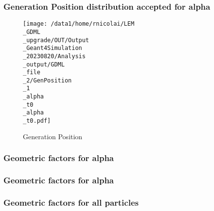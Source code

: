 \documentclass[8pt]{beamer}
\begin{document}
            \begin{frame}
                \frametitle{Generation Position distribution accepted for alpha}
            
        \begin{figure}[h]
            \centering
            \texttt{[image: /data1/home/rnicolai/LEM\\\_GDML\\\_upgrade/OUT/Output\\\_Geant4Simulation\\\_20230820/Analysis\\\_output/GDML\\\_file\\\_2/GenPosition\\\_1\\\_alpha\\\_t0\\\_alpha\\\_t0.pdf]}
            \caption{Generation Position}
        \end{figure}
        
            \end{frame}
            
            \begin{frame}
                \frametitle{Geometric factors for alpha}
            
            \end{frame}
            
            \begin{frame}
                \frametitle{Geometric factors for alpha}
            
            \end{frame}
            
            \begin{frame}
                \frametitle{Geometric factors for all particles}
            
            \end{frame}
            
        
\end{document}
